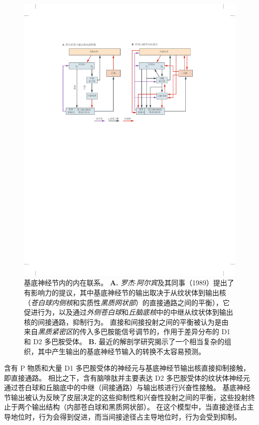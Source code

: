 \begin{figure}[htbp]
	\centering
	\includegraphics[width=1.0\linewidth]{chap38/fig_38_3}
	\caption{基底神经节内的内在联系。
		\textbf{A.} \textit{罗杰$\cdot$阿尔宾}及其同事（1989）提出了有影响力的提议，其中基底神经节的输出取决于从纹状体到输出核（\textit{苍白球内侧核}和实质性\textit{黑质网状部}）的直接通路之间的平衡），它促进行为，以及通过\textit{外侧苍白球}和\textit{丘脑底核}中的中继从纹状体到输出核的间接通路，抑制行为。
		直接和间接投射之间的平衡被认为是由来自\textit{黑质紧密区}的传入多巴胺能信号调节的，作用于差异分布的 D1 和 D2 多巴胺受体。
		\textbf{B.} 最近的解剖学研究揭示了一个相当复杂的组织，其中产生输出的基底神经节输入的转换不太容易预测。}
	\label{fig:38_3}
\end{figure}


含有 P 物质和大量 D1 多巴胺受体的神经元与基底神经节输出核直接抑制接触，即直接通路。
相比之下，含有脑啡肽并主要表达 D2 多巴胺受体的纹状体神经元通过苍白球和丘脑底中的中继（间接通路）与输出核进行兴奋性接触。
基底神经节输出被认为反映了皮层决定的这些抑制性和兴奋性投射之间的平衡，这些投射终止于两个输出结构（内部苍白球和黑质网状部）。
在这个模型中，当直接途径占主导地位时，行为会得到促进，而当间接途径占主导地位时，行为会受到抑制。



